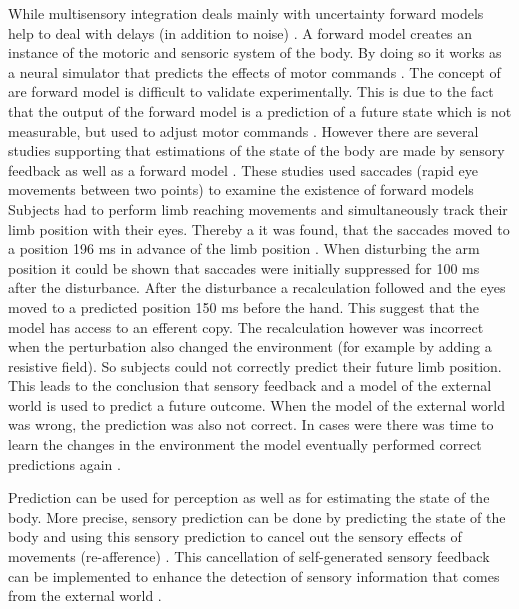 \documentclass{SeminarV2}
\begin{document}
While multisensory integration deals mainly with uncertainty forward models help to deal with delays (in addition to noise) \cite{franklin2011computational}. A forward model creates an instance of the motoric and sensoric system of the body. By doing so it works as a neural simulator that predicts the effects of motor commands \cite{franklin2011computational}. The concept of are forward model is difficult to validate experimentally. This is due to the fact that the output of the forward model is a prediction of a future state which is not measurable, but used to adjust motor commands \cite{mehta2002forward}. 
 However there are several studies supporting that estimations of the state of the body are made by sensory feedback as well as a forward model \cite{ariff2002real} \cite{nanayakkara2003saccade}. These studies used saccades (rapid eye movements between two points) to examine the existence of forward models
Subjects had to perform limb reaching movements and simultaneously track their limb position with their eyes. Thereby a it was found, that the saccades moved to a position 196 ms in advance of the limb position \cite{ariff2002real} . When disturbing the arm position it could be shown that saccades were initially suppressed for 100 ms after the disturbance. After the disturbance a recalculation followed and the eyes moved to a predicted position 150 ms before the hand. This suggest that the model has access to an efferent copy. The recalculation however was incorrect when the perturbation also changed the environment (for example by adding a resistive field). So subjects could not correctly predict their future limb position. This leads to the conclusion that sensory feedback and a model of the external world is used to predict a future outcome. When the model of the external world was wrong, the prediction was also not correct. In cases were there was time to learn the changes in the environment the model eventually performed correct predictions again \cite{nanayakkara2003saccade} . \newline

Prediction can be used for perception as well as for estimating the state of the body. More precise, sensory
prediction can be done by predicting the state of the
body and using this sensory prediction to cancel out the sensory
effects of movements (re-afference) \cite{franklin2011computational}.
This cancellation of self-generated sensory
feedback can be implemented to enhance the detection of sensory information that comes from the external world \cite{wolpert2001motor}. 
\end{document}
